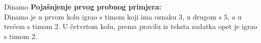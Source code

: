 \begin{statement}[
  problempoints=20,
  timelimit=1 sekunda,
  memorylimit=512 MiB,
]{Dinamo}
\textbf{Pojašnjenje prvog probnog primjera:} \\
Dinamo je u prvom kolu igrao s timom koji ima oznaku $3$, u drugom s $5$, a u
trećem s timom $2$. U četvrtom kolu, prema pravilu iz teksta zadatka opet
je igrao s timom $2$.

\end{statement}

